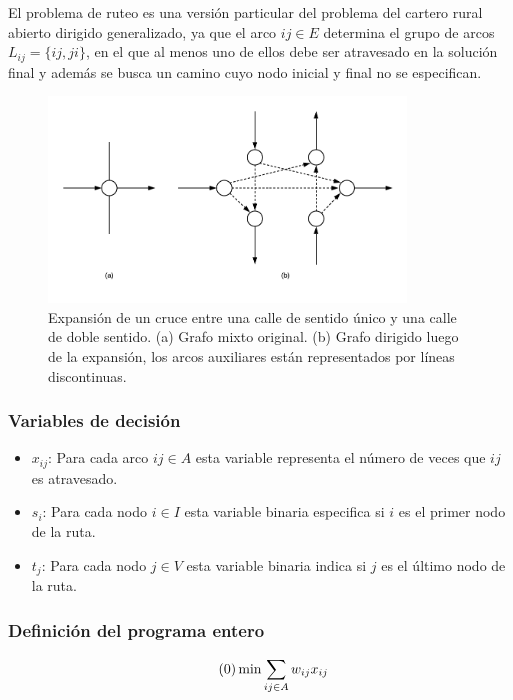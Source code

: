 \documentclass[conference,compsoc]{IEEEtran}
\begin{document}
El problema de ruteo es una versión particular del problema del cartero rural abierto dirigido generalizado, ya que el arco $i j \in E $ determina el grupo de arcos $L_{i j} = \{i j, j i\}$, en el que al menos uno de ellos debe ser atravesado en la solución final y además se busca un camino cuyo nodo inicial y final no se especifican.

\begin{figure}[tbp]
\centerline{\includegraphics[width=9.5cm]{imagenes/expanded_graph.png}}
\caption{Expansión de un cruce entre una calle de sentido único y una calle de doble sentido. (a) Grafo mixto original. (b) Grafo dirigido luego de la expansión, los arcos auxiliares están representados por líneas discontinuas. \cite{Braier2017AnArgentina}}
\label{fig:grafo_expandido}
\end{figure}

\subsubsection{Variables de decisión}
\begin{itemize}
\item $x_{i j}$: Para cada arco $ {i j} \in A$ esta variable representa el número de veces que $i j$ es atravesado.

\item $s_i$: Para cada nodo $i \in I$ esta variable binaria especifica si  $i$ es el primer nodo de la ruta.

\item $t_j$: Para cada nodo $j \in V$ esta variable binaria indica si $j$ es el último nodo de la ruta.
\end{itemize}

\subsubsection{Definición del programa entero}
\label{sec:programa-entero}
\begin{equation} \tag{0} \label{eq0}
\min \sum_{i j \in A} w_{i j} x_{i j}  \\
\end{equation} 
\hbox{}
\end{document}
